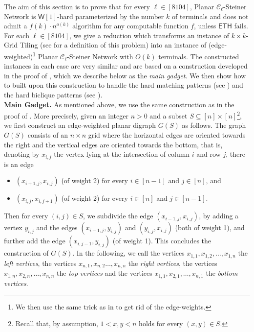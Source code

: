 \documentclass[a4paper,11pt]{article}
\theoremstyle{plain}
\newtheorem{identification rule}{Identification Rule}
\theoremstyle{definition}
\theoremstyle{remark}
\begin{document}
The aim of this section is to prove that for every $\ell \in [8104]$, {\sc Planar $\mathcal{C}_\ell$-Steiner Network} 
is $\mathsf{W}[1]$-hard parameterized by the number $k$ of terminals and does not admit a
$f(k) \cdot n^{o(k)}$ algorithm for any computable function $f$, unless $\mathsf{ETH}$ fails.
For each $\ell \in [8104]$, we give a reduction which transforms an instance of {\sc $k \times k$-Grid Tiling} (see  for a definition of this problem) into an instance of (edge-weighted)\footnote{We then use the same trick as in  to get rid of the edge-weights.} {\sc Planar $\mathcal{C}_\ell$-Steiner Network} with $O(k)$ terminals.
The constructed instances in each case are very similar and are based on a construction developed in the proof of \cite[Theorem 1.4]{ChitnisFHM20}, which we describe below as the \emph{main gadget}. We then show how to built upon this construction to handle the hard matching patterns (see ) and the hard biclique patterns (see ).\\

\noindent
\textbf{Main Gadget.} As mentioned above, we use the same construction as in the proof of \cite[Theorem 1.4]{ChitnisFHM20}. More precisely, given an integer $n > 0$ and a subset $S \subseteq [n] \times [n]$\footnote{Recall that, by assumption, $1 < x,y< n$ holds for every $(x,y) \in S$.}, we first construct an edge-weighted planar digraph $G(S)$ as follows. The graph $G(S)$ consists of an $n \times n$ grid where the horizontal edges are oriented towards the right and the vertical edges are oriented towards the bottom, that is, denoting by $x_{i,j}$ the vertex lying at the intersection of column $i$ and row $j$, there is an edge 
\begin{itemize}
\item $(x_{i+1,j},x_{i,j})$ (of weight 2) for every $i \in [n-1]$ and $j \in [n]$, and 
\item $(x_{i,j},x_{i,j+1})$ (of weight 2) for every $i \in [n]$ and $j \in [n-1]$. 
\end{itemize}
Then for every $(i,j) \in S$, we subdivide the edge $(x_{i-1,j},x_{i,j})$, by adding a vertex $y_{i,j}$ and the edges $(x_{i-1,j},y_{i,j})$ and $(y_{i,j},x_{i,j})$ (both of weight 1), and further add the edge $(x_{i,j-1},y_{i,j})$ (of weight 1). 
This concludes the construction of $G(S)$.
In the following, we call the vertices $x_{1,1},x_{1,2},\ldots,x_{1,n}$ the \emph{left vertices}, the vertices $x_{n,1}, x_{n,2}\ldots,x_{n,n}$ the \emph{right vertices}, the vertices $x_{1,n},x_{2,n}, \ldots,x_{n,n}$ the \emph{top vertices} and the vertices $x_{1,1},x_{2,1},\ldots, x_{n,1}$ the \emph{bottom vertices}. \\
\end{document}
